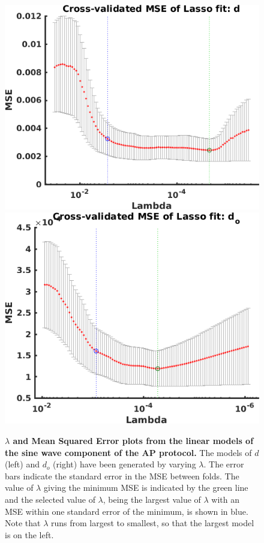\documentclass[11pt,a4paper,oneside]{article}
\begin{document}
\begin{figure}[hb]
\begin{center}
\includegraphics[scale=0.42]{Figures/LASSO_AP_AP_full_lambda_d.png}
\includegraphics[scale=0.42]{Figures/LASSO_AP_AP_full_lambda_od.png}
\caption{\textbf{$\lambda$ and Mean Squared Error plots from the linear models of the sine wave component of the AP protocol.} The models of $d$ (left) and $d_o$ (right) have been generated by varying $\lambda$. The error bars indicate the standard error in the MSE between folds. The value of $\lambda$ giving the minimum MSE is indicated by the green line and the selected value of $\lambda$, being the largest value of $\lambda$ with an MSE within one standard error of the minimum, is shown in blue. Note that $\lambda$ runs from largest to smallest, so that the largest model is on the left.}
\label{Fig_LASSO_AP_AP_full_lambda}
\end{center}
\end{figure}
\end{document}
